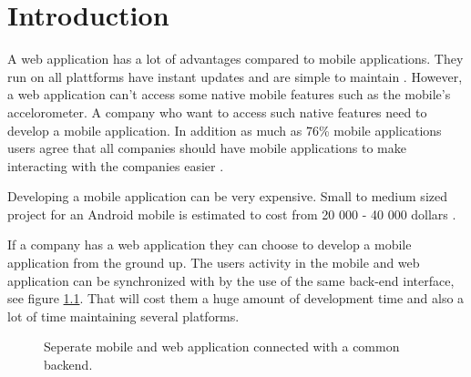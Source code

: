 \chapter{Introduction}
A web application has a lot of advantages compared to mobile applications. They run on all plattforms have instant updates and are simple to maintain \cite{michaels2013}. However, a web application can't access some native mobile features such as the mobile's accelorometer. A company who want to access such native features need to develop a mobile application. In addition as much as 76\% mobile applications users agree that all companies should have mobile applications to make interacting with the companies easier \cite{harris2010}. 

Developing a mobile application can be very expensive. Small to medium sized project for an Android mobile is estimated to cost from 20 000 - 40 000 dollars \cite{kohan2015}. 

If a company has a web application they can choose to develop a mobile application from the ground up. The users activity in the mobile and web application can be synchronized with by the use of the same back-end interface, see figure \ref{figure-common-backend}. That will cost them a huge amount of development time and also a lot of time maintaining several platforms.
\begin{figure}\label{figure-common-backend}
\centering
{} 
\medskip
\caption{Seperate mobile and web application connected with a common backend.} 
\end{figure}

